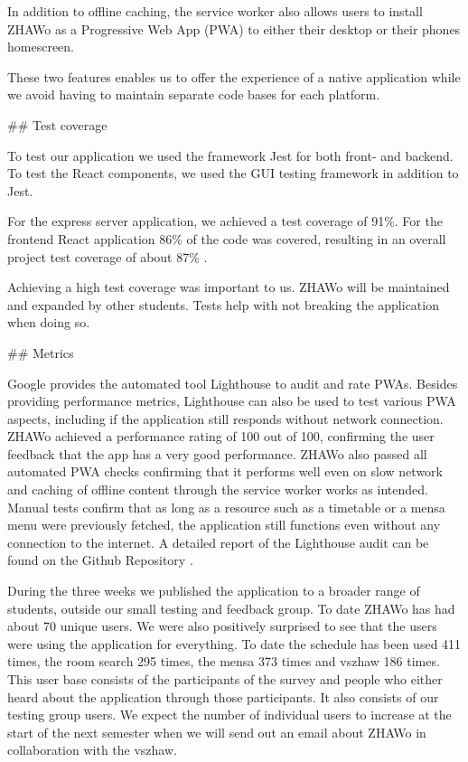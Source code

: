 \begin{markdown}
In addition to offline caching, the service worker also allows users to install ZHAWo as a Progressive Web App (PWA) \cite{WhatIsPWA} to either their desktop or their phones homescreen.

These two features enables us to offer the experience of a native application while we avoid having to maintain separate code bases for each platform.

\newpage

## Test coverage

To test our application we used the framework Jest \cite{Jest} for both front- and backend. To test the React components, we used the GUI testing framework \cite{Enzyme} in addition to Jest.

For the express server application, we achieved a test coverage of 91\%. For the frontend React application 86\% of the code was covered, resulting in an overall project test coverage of about 87\% \cite{OurCoverage}.

Achieving a high test coverage was important to us. ZHAWo will be maintained and expanded by other students. Tests help with not breaking the application when doing so.

## Metrics

Google provides the automated tool Lighthouse \cite{Lighthouse} to audit and rate PWAs. Besides providing performance metrics, Lighthouse can also be used to test various PWA aspects, including if the application still responds without network connection. ZHAWo achieved a performance rating of 100 out of 100, confirming the user feedback that the app has a very good performance. ZHAWo also passed all automated PWA checks confirming that it performs well even on slow network and caching of offline content through the service worker works as intended. Manual tests confirm that as long as a resource such as a timetable or a mensa menu were previously fetched, the application still functions even without any connection to the internet. A detailed report of the Lighthouse audit can be found on the Github Repository \cite{OurGithub}.

During the three weeks we published the application to a broader range of students, outside our small testing and feedback group. To date ZHAWo has had about 70 unique users. We were also positively surprised to see that the users were using the application for everything. To date the schedule has been used 411 times, the room search 295 times, the mensa 373 times and vszhaw 186 times. This user base consists of the participants of the survey and people who either heard about the application through those participants. It also consists of our testing group users. We expect the number of individual users to increase at the start of the next semester when we will send out an email about ZHAWo in collaboration with the vszhaw.


\end{markdown}
